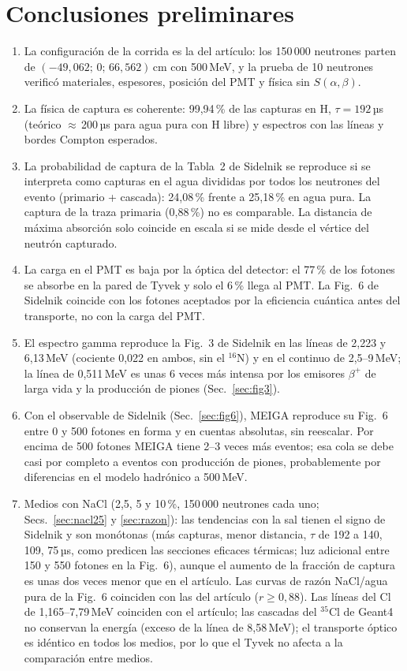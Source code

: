 \documentclass[11pt,a4paper]{article}
\begin{document}
\section{Conclusiones preliminares}
\begin{enumerate}
\item La configuración de la corrida es la del artículo: los 150\,000 neutrones parten de $(-49{,}062;\,0;\,66{,}562)$\,cm con 500\,MeV, y la prueba de 10 neutrones verificó materiales, espesores, posición del PMT y física sin $S(\alpha,\beta)$.
\item La física de captura es coherente: 99,94\,\% de las capturas en H, $\tau = 192$\,µs (teórico $\approx$\,200\,µs para agua pura con H libre) y espectros con las líneas y bordes Compton esperados.
\item La probabilidad de captura de la Tabla~2 de Sidelnik se reproduce si se interpreta como capturas en el agua divididas por todos los neutrones del evento (primario + cascada): 24,08\,\% frente a 25,18\,\% en agua pura. La captura de la traza primaria (0,88\,\%) no es comparable. La distancia de máxima absorción
solo coincide en escala si se mide desde el vértice del neutrón capturado.
\item La carga en el PMT es baja por la óptica del detector: el 77\,\% de los fotones se absorbe en la pared de Tyvek y solo el 6\,\% llega al PMT. La Fig.~6 de Sidelnik coincide con los fotones aceptados por la eficiencia cuántica antes del transporte, no con la carga del PMT.
\item El espectro gamma reproduce la Fig.~3 de Sidelnik en las líneas de 2,223 y 6,13\,MeV (cociente 0,022 en ambos, sin el $^{16}$N) y en el continuo de 2,5--9\,MeV; la línea de 0,511\,MeV es unas 6 veces más intensa por los emisores $\beta^+$ de larga vida y la producción de piones (Sec.~\ref{sec:fig3}).
\item Con el observable de Sidelnik (Sec.~\ref{sec:fig6}), MEIGA reproduce su Fig.~6 entre 0 y 500 fotones en forma y en cuentas absolutas, sin reescalar. Por encima de 500 fotones MEIGA tiene 2--3 veces más eventos; esa cola se debe casi por completo a eventos con producción de piones, probablemente por diferencias en el modelo hadrónico a 500\,MeV.
\item Medios con NaCl (2,5, 5 y 10\,\%, 150\,000 neutrones cada uno; Secs.~\ref{sec:nacl25} y \ref{sec:razon}): las tendencias con la sal tienen el signo de Sidelnik y son monótonas (más capturas, menor distancia, $\tau$ de 192 a 140, 109, 75\,µs, como predicen las secciones eficaces térmicas; luz adicional entre 150 y 550 fotones en la Fig.~6), aunque el aumento de la fracción de captura es unas dos veces menor que en el artículo. Las curvas de razón NaCl/agua pura de la Fig.~6 coinciden con las del artículo ($r \geq 0{,}88$). Las líneas del Cl de 1,165--7,79\,MeV coinciden con el artículo; las cascadas del $^{35}$Cl de Geant4 no conservan la energía (exceso de la línea de 8,58\,MeV); el transporte óptico es idéntico en todos los medios, por lo que el Tyvek no afecta a la comparación entre medios.

\end{enumerate}
\end{document}
